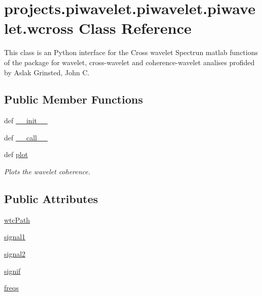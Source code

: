 \hypertarget{classprojects_1_1piwavelet_1_1piwavelet_1_1piwavelet_1_1wcross}{\section{projects.\-piwavelet.\-piwavelet.\-piwavelet.\-wcross Class Reference}
\label{classprojects_1_1piwavelet_1_1piwavelet_1_1piwavelet_1_1wcross}
}


This class is an Python interface for the Cross wavelet Spectrun matlab functions of the package for wavelet, cross-\/wavelet and coherence-\/wavelet analises profided by Aslak Grinsted, John C.  


\subsection*{Public Member Functions}
\begin{DoxyCompactItemize}
\item 
def \hyperlink{classprojects_1_1piwavelet_1_1piwavelet_1_1piwavelet_1_1wcross_a6151f1deb4a5df5c05ac8912ca9b3d96}{\-\_\-\-\_\-init\-\_\-\-\_\-}
\item 
def \hyperlink{classprojects_1_1piwavelet_1_1piwavelet_1_1piwavelet_1_1wcross_ae8c31630caa44667163f2e062bea1112}{\-\_\-\-\_\-call\-\_\-\-\_\-}
\item 
def \hyperlink{classprojects_1_1piwavelet_1_1piwavelet_1_1piwavelet_1_1wcross_a0049890381c6e08e8818cff423ccb6f1}{plot}
\begin{DoxyCompactList}\small\item\em Plots the wavelet coherence. \end{DoxyCompactList}\end{DoxyCompactItemize}
\subsection*{Public Attributes}
\begin{DoxyCompactItemize}
\item 
\hyperlink{classprojects_1_1piwavelet_1_1piwavelet_1_1piwavelet_1_1wcross_a8ade737d0532c865030225882e5c77b3}{wtc\-Path}
\item 
\hyperlink{classprojects_1_1piwavelet_1_1piwavelet_1_1piwavelet_1_1wcross_ae685fd264b719b76e0a5095cb4b65a98}{signal1}
\item 
\hyperlink{classprojects_1_1piwavelet_1_1piwavelet_1_1piwavelet_1_1wcross_ab50c021343313dd3495d5eb98d0bb6ad}{signal2}
\item 
\hyperlink{classprojects_1_1piwavelet_1_1piwavelet_1_1piwavelet_1_1wcross_a953bc3895a845140197683cd3127fbad}{signif}
\item 
\hyperlink{classprojects_1_1piwavelet_1_1piwavelet_1_1piwavelet_1_1wcross_acc328d10acf4d14d4cc310626db363f0}{freqs}
\end{DoxyCompactItemize}


